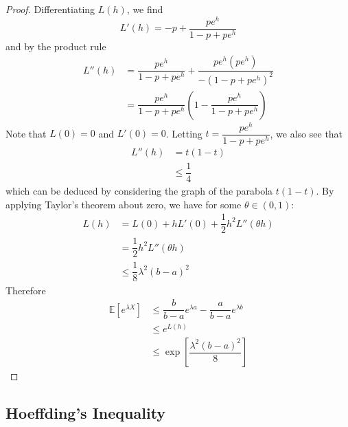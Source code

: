 \documentclass[11pt]{report} %
\begin{document}
\begin{proof}
Differentiating $L\left(h\right)$, we find
\begin{equation}
L'\left(h\right) = -p + \dfrac{pe^{h}}{1 - p + pe^{h}}
\end{equation}
and by the product rule
\begin{align}
L''\left(h\right) &= \dfrac{pe^{h}}{1 - p + pe^{h}} + \dfrac{pe^{h}\left(pe^{h}\right)}{-\left(1 - p + pe^{h}\right)^{2}} \\
&= \dfrac{pe^{h}}{1 - p + pe^{h}}\left(1 - \dfrac{pe^{h}}{1 - p + pe^{h}} \right)
\end{align}
Note that $L\left(0\right) = 0$ and $L'\left(0\right) = 0$. Letting $t = \dfrac{pe^{h}}{1 - p + pe^{h}}$, we also see that
\begin{align}
L''\left(h\right) &= t\left(1 - t\right) \\
&\leq \dfrac{1}{4}
\end{align}
which can be deduced by considering the graph of the parabola $t\left(1 - t\right)$. By applying Taylor's theorem about zero, we have for some $\theta\in\left(0, 1\right)$:
\begin{align}
L\left(h\right) &= L\left(0\right) + hL'\left(0\right) + \dfrac{1}{2}h^{2}L''\left(\theta h\right) \\
&= \dfrac{1}{2}h^{2}L''\left(\theta h\right) \\
&\leq \dfrac{1}{8}\lambda^{2}\left(b - a\right)^{2}
\end{align}
Therefore
\begin{align}
\mathbb{E}\left[e^{\lambda X}\right] &\leq \dfrac{b}{b - a}e^{\lambda a} - \dfrac{a}{b - a}e^{\lambda b} \\
&\leq e^{L\left(h\right)} \\
&\leq \exp\left[\dfrac{\lambda^{2}\left(b - a\right)^{2}}{8}\right]
\end{align}
\end{proof}

\subsection{Hoeffding's Inequality}
\end{document}
